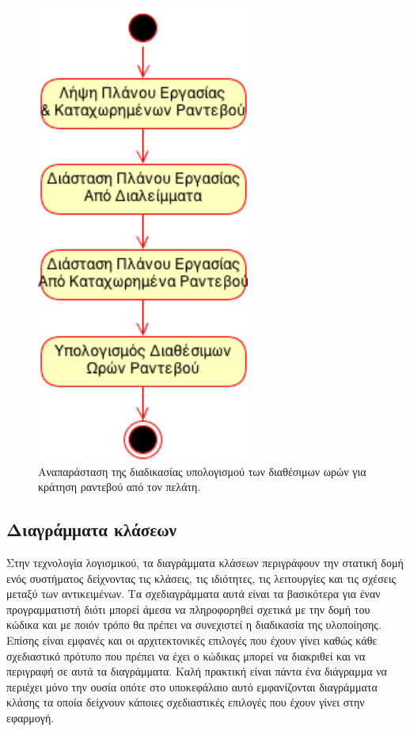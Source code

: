\begin{figure}
\centering
\includegraphics[width=70mm]{images/ad-provider-available-hours.png}
\caption{Αναπαράσταση της διαδικασίας υπολογισμού των διαθέσιμων ωρών για κράτηση ραντεβού από τον πελάτη.}
\label{ad-provider-available-hours}
\end{figure}

\subsection{Διαγράμματα κλάσεων}
Στην τεχνολογία λογισμικού, τα διαγράμματα κλάσεων περιγράφουν την στατική δομή ενός συστήματος δείχνοντας τις κλάσεις, τις ιδιότητες, τις λειτουργίες και τις σχέσεις μεταξύ των αντικειμένων. Τα σχεδιαγράμματα αυτά είναι τα βασικότερα για έναν προγραμματιστή διότι μπορεί άμεσα να πληροφορηθεί σχετικά με την δομή του κώδικα και με ποιόν τρόπο θα πρέπει να συνεχιστεί η διαδικασία της υλοποίησης. Επίσης είναι εμφανές και οι αρχιτεκτονικές επιλογές που έχουν γίνει καθώς κάθε σχεδιαστικό πρότυπο που πρέπει να έχει ο κώδικας μπορεί να διακριθεί και να περιγραφή σε αυτά τα διαγράμματα. Καλή πρακτική είναι πάντα ένα διάγραμμα να περιέχει μόνο την ουσία οπότε στο υποκεφάλαιο αυτό εμφανίζονται διαγράμματα κλάσης τα οποία δείχνουν κάποιες σχεδιαστικές επιλογές που έχουν γίνει στην εφαρμογή.

